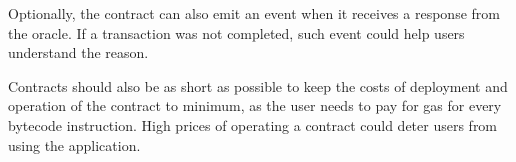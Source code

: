 Optionally, the contract can also emit an event when it receives a response from the oracle. If a transaction was not completed, such event could help users understand the reason.

Contracts should also be as short as possible to keep the costs of deployment and operation of the contract to minimum, as the user needs to pay for gas for every bytecode instruction. High prices of operating a contract could deter users from using the application.
